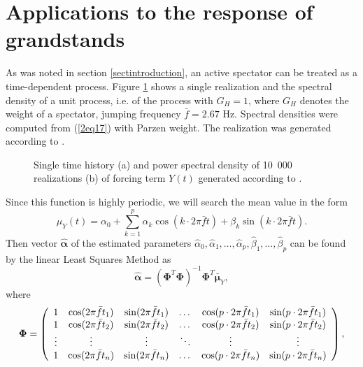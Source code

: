 \documentclass[preprint,12pt,authoryear]{elsarticle}
\newcommand{\bs}[1]{{\boldsymbol{#1}}}
\begin{document}
\section{Applications to the response of grandstands}
\label{appToGrandstands}
As was noted in section \ref{sectintroduction}, an active spectator can be treated as a time-dependent process. Figure \ref{3fig1} shows a single realization and the spectral density of a unit process, i.e. of the process with $G_H=1$, where $G_H$ denotes the weight of a spectator, jumping frequency $\bar{f}=2.67$ Hz. Spectral densities were computed from (\ref{2eq17}) with Parzen weight. The realization was generated according to \cite{Sim}.
\begin{figure}
	\centering
	\caption{Single time history (a) and power spectral density of 10~000 realizations (b) of forcing term $Y(t)$ generated according to \cite{Sim}.}
	\label{3fig1}
\end{figure}
Since this function is highly periodic, we will search the mean value in the form
\begin{equation}
\mu_Y(t)=\alpha_0+\sum_{k=1}^p\alpha_k\cos(k\cdot2\pi\bar{f}t)+\beta_k\sin(k\cdot2\pi\bar{f}t).
\label{3eq1}
\end{equation}
Then vector $\bs{\hat{\alpha}}$ of the estimated parameters $\hat{\alpha}_0,\hat{\alpha}_1,\dots,\hat{\alpha}_p,\hat{\beta}_1,\dots,\hat{\beta}_p$ can be found by the linear Least Squares Method as
\begin{equation}
\bs{\hat{\alpha}}=(\bs{\Phi}^T\bs{\Phi})^{-1}\bs{\Phi}^T{\bs{\bar{\mu}}_Y},
\label{3eq2}
\end{equation}
where 
\begin{equation*}
\bs{\Phi}=
\left(\begin{array}{c c c c c c}
1 & \cos(2\pi\bar{f}t_1) & \sin(2\pi\bar{f}t_1) & \dots & \cos(p\cdot2\pi\bar{f}t_1) & \sin(p\cdot2\pi\bar{f}t_1)\\
1 & \cos(2\pi\bar{f}t_2) & \sin(2\pi\bar{f}t_2) & \dots & \cos(p\cdot2\pi\bar{f}t_2) & \sin(p\cdot2\pi\bar{f}t_2)\\
\vdots & \vdots & \vdots & \ddots & \vdots & \vdots\\
1 & \cos(2\pi\bar{f}t_n) & \sin(2\pi\bar{f}t_n) & \dots & \cos(p\cdot2\pi\bar{f}t_n) & \sin(p\cdot2\pi\bar{f}t_n)\\
\end{array}\right),
\end{equation*}
\end{document}
